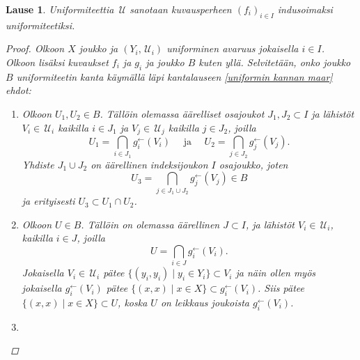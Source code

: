 \documentclass[12pt,a4paper,leqno]{report}
\newcommand{\U}{\,\mathcal{U}}
\theoremstyle{plain}
\newtheorem{lause}[equation]{Lause}
\theoremstyle{definition}
\theoremstyle{remark}
\begin{document}
\begin{lause}
Uniformiteettia $\U$ sanotaan 
kuvausperheen $(f_i)_{i\in I}$ indusoimaksi uniformiteetiksi.  
\begin{proof}
Olkoon $X$ joukko ja $(Y_i,\U_i)$ uniforminen avaruus jokaisella $i\in I$. 
Olkoon lisäksi kuvaukset $f_i$ ja $g_i$ ja joukko $B$ kuten yllä.
Selvitetään, onko joukko $B$ uniformiteetin kanta käymällä läpi 
kantalauseen \ref{uniformin kannan maar} ehdot:
\begin{enumerate} %
\item[\ref{B_I}] 
Olkoon $U_1,U_2\in B$. 
Tällöin olemassa äärelliset osajoukot $J_1,J_2\subset I$ 
ja lähistöt $V_i\in\U_i$ kaikilla $i\in J_1$ 
ja $V_j\in\U_j$ kaikilla $j\in J_2$, 
joilla 
\begin{equation*}
U_1=\bigcap_{i\in J_1}g^{\leftarrow}_{i}(V_{i})\quad\text{ ja 
 }\quad U_2=\bigcap_{j\in J_2}g^{\leftarrow}_{j}(V_{j}).
\end{equation*}
Yhdiste $J_1\cup J_2$ on äärellinen indeksijoukon $I$ osajoukko, 
joten 
 $$U_3=\bigcap_{j\in J_1\cup J_2}g^{\leftarrow}_{j}(V_{j})\in B$$
 ja erityisesti $U_3\subset U_1\cap U_2$.
\item[\ref{U'_I}] 
Olkoon $U\in B$. Tällöin on olemassa äärellinen $J\subset I$, 
ja lähistöt $V_i\in\U_i$, kaikilla $i\in J$, 
joilla
\begin{equation*}
U=\bigcap_{i\in J}g^{\leftarrow}_{i}(V_{i}).
\end{equation*}
Jokaisella $V_i\in \U_i$ pätee $\{(y_i,y_i)\mid y_i\in Y_i\}\subset V_i$ 
ja näin ollen myös jokaisella $g_i^{\leftarrow}(V_i)$ pätee 
$\{(x,x)\mid x\in X\}\subset g_i^{\leftarrow}(V_i)$. 
Siis pätee $\{(x,x)\mid x\in X\}\subset U$, 
koska $U$ on leikkaus joukoista $g_i^{\leftarrow}(V_i)$.
\item[\ref{U'_II}] 

\end{enumerate}
\end{proof}
\end{lause}
\end{document}
